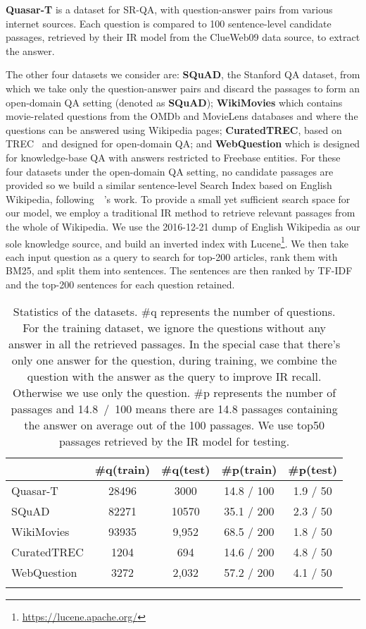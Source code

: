 \documentclass[letterpaper]{article} \usepackage{aaai18}  \usepackage{times}  \usepackage{helvet}  \usepackage{courier}  \usepackage{url}  \usepackage{graphicx}  \usepackage{comment}
\begin{document}
\textbf{Quasar-T} is a dataset for
SR-QA, with
question-answer pairs from various internet sources. Each question is compared to 100 sentence-level candidate passages, retrieved by their IR model from the ClueWeb09 data source, to extract the answer. 

The other four datasets we consider are: \textbf{SQuAD}, the Stanford QA dataset, from which we take only the question-answer pairs and discard the passages to form an open-domain QA setting (denoted as \textbf{SQuAD});
\textbf{WikiMovies} which contains movie-related questions from the OMDb and MovieLens databases and where the questions can be answered using Wikipedia pages; \textbf{CuratedTREC}, based on TREC~\cite{voorhees2000building} and designed for open-domain QA; and \textbf{WebQuestion} which is designed for knowledge-base QA with answers restricted to Freebase entities.
For these four datasets under the open-domain QA setting, no candidate passages are provided so we build a similar sentence-level Search Index based on English Wikipedia,
following~\citeauthor{chen2017reading}~\citeyear{chen2017reading}'s work.
To provide a small yet sufficient search space for our model, we employ a traditional IR method to retrieve relevant passages from the whole of Wikipedia. We use the 2016-12-21 dump of English Wikipedia as our sole knowledge source, and build an inverted index with Lucene\footnote{\url{https://lucene.apache.org/}}. We then take each input question as a query to search for top-200 articles, rank them with BM25, and split them into sentences.  The sentences are then ranked by TF-IDF and the top-200 sentences for each question retained.



\begin{table}[]
\centering
\small
\begin{tabular}{lcccc}
\toprule
            & \#q(train) & \#q(test)  & \#p(train) & \#p(test)\\
\midrule
Quasar-T    & 28496 & 3000  & 14.8 / 100 & 1.9 / 50 \\
SQuAD       & 82271 & 10570 & 35.1 / 200 & 2.3 / 50 \\
WikiMovies  & 93935 & 9,952 & 68.5 / 200 & 1.8 / 50 \\
CuratedTREC & 1204  & 694   & 14.6 / 200 & 4.8 / 50 \\
WebQuestion & 3272  & 2,032 & 57.2 / 200 & 4.1 / 50 \\
\bottomrule
\normalsize
\end{tabular}
\caption{Statistics of the datasets. \#q represents the number of questions. For the training dataset, we ignore the questions without any answer in all the retrieved passages. In the special case that there's only one answer for the question, during training, we combine the question with the answer as the query to improve IR recall.  Otherwise we use only the question. \#p represents the number of passages and 14.8~/~100 means there are 14.8 passages containing the answer on average out of the 100 passages. We use top50 passages retrieved by the IR model for testing. }
\label{datasets}
\end{table}
\end{document}
